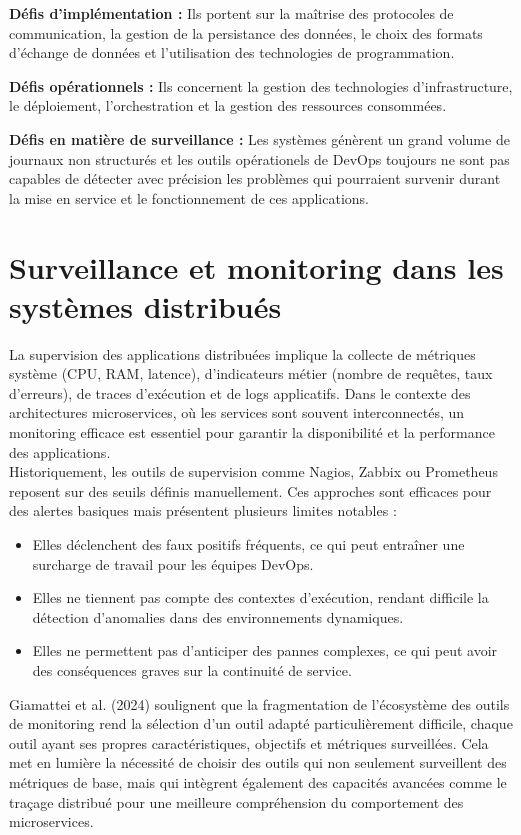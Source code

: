 \documentclass[a4paper,12pt]{report}
\begin{document}
\textbf{Défis d'implémentation :} Ils portent sur la maîtrise des protocoles de communication, la gestion de la persistance des données, le choix des formats d'échange de données et l'utilisation des technologies de programmation.

\textbf{Défis opérationnels :} Ils concernent la gestion des technologies d'infrastructure, le déploiement, l'orchestration et la gestion des ressources consommées.

\textbf{Défis en matière de surveillance :} Les systèmes génèrent un grand volume de journaux non structurés et les outils opérationels de DevOps toujours ne sont pas capables de détecter avec précision les problèmes qui pourraient survenir durant la mise en service et le fonctionnement de ces applications.

\section{Surveillance et monitoring dans les systèmes distribués}

La supervision des applications distribuées implique la collecte de métriques système (CPU, RAM, latence), d’indicateurs métier (nombre de requêtes, taux d’erreurs), de traces d’exécution et de logs applicatifs. Dans le contexte des architectures microservices, où les services sont souvent interconnectés, un monitoring efficace est essentiel pour garantir la disponibilité et la performance des applications.\\

Historiquement, les outils de supervision comme Nagios, Zabbix ou Prometheus reposent sur des seuils définis manuellement. Ces approches sont efficaces pour des alertes basiques mais présentent plusieurs limites notables :
\begin{itemize}
\item Elles déclenchent des faux positifs fréquents, ce qui peut entraîner une surcharge de travail pour les équipes DevOps.
\item Elles ne tiennent pas compte des contextes d'exécution, rendant difficile la détection d'anomalies dans des environnements dynamiques.
\item Elles ne permettent pas d’anticiper des pannes complexes, ce qui peut avoir des conséquences graves sur la continuité de service.
\end{itemize}

Giamattei et al. (2024) \cite{giamattei2024} soulignent que la fragmentation de l'écosystème des outils de monitoring rend la sélection d'un outil adapté particulièrement difficile, chaque outil ayant ses propres caractéristiques, objectifs et métriques surveillées. Cela met en lumière la nécessité de choisir des outils qui non seulement surveillent des métriques de base, mais qui intègrent également des capacités avancées comme le traçage distribué pour une meilleure compréhension du comportement des microservices.
\end{document}
